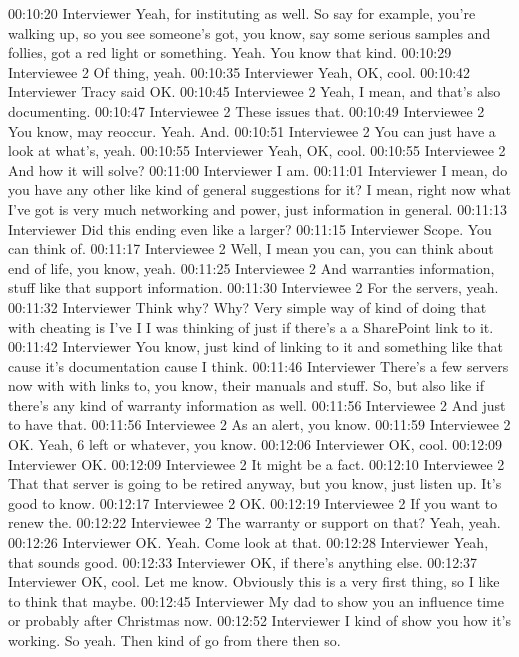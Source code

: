 00:10:20 Interviewer
Yeah, for instituting as well. So say for example, you're walking up, so you see someone's got, you know, say some serious samples and follies, got a red light or something. Yeah. You know that kind.
00:10:29 Interviewee 2 
Of thing, yeah.
00:10:35 Interviewer
Yeah, OK, cool.
00:10:42 Interviewer
Tracy said OK.
00:10:45 Interviewee 2 
Yeah, I mean, and that's also documenting.
00:10:47 Interviewee 2 
These issues that.
00:10:49 Interviewee 2 
You know, may reoccur. Yeah. And.
00:10:51 Interviewee 2 
You can just have a look at what's, yeah.
00:10:55 Interviewer
Yeah, OK, cool.
00:10:55 Interviewee 2 
And how it will solve?
00:11:00 Interviewer
I am.
00:11:01 Interviewer
I mean, do you have any other like kind of general suggestions for it? I mean, right now what I've got is very much networking and power, just information in general.
00:11:13 Interviewer
Did this ending even like a larger?
00:11:15 Interviewer
Scope. You can think of.
00:11:17 Interviewee 2 
Well, I mean you can, you can think about end of life, you know, yeah.
00:11:25 Interviewee 2 
And warranties information, stuff like that support information.
00:11:30 Interviewee 2 
For the servers, yeah.
00:11:32 Interviewer
Think why? Why? Very simple way of kind of doing that with cheating is I've I I was thinking of just if there's a a SharePoint link to it.
00:11:42 Interviewer
You know, just kind of linking to it and something like that cause it's documentation cause I think.
00:11:46 Interviewer
There's a few servers now with with links to, you know, their manuals and stuff. So, but also like if there's any kind of warranty information as well.
00:11:56 Interviewee 2 
And just to have that.
00:11:56 Interviewee 2 
As an alert, you know.
00:11:59 Interviewee 2 
OK. Yeah, 6 left or whatever, you know.
00:12:06 Interviewer
OK, cool.
00:12:09 Interviewer
OK.
00:12:09 Interviewee 2 
It might be a fact.
00:12:10 Interviewee 2 
That that server is going to be retired anyway, but you know, just listen up. It's good to know.
00:12:17 Interviewee 2 
OK.
00:12:19 Interviewee 2 
If you want to renew the.
00:12:22 Interviewee 2 
The warranty or support on that? Yeah, yeah.
00:12:26 Interviewer
OK. Yeah. Come look at that.
00:12:28 Interviewer
Yeah, that sounds good.
00:12:33 Interviewer
OK, if there's anything else.
00:12:37 Interviewer
OK, cool. Let me know. Obviously this is a very first thing, so I like to think that maybe.
00:12:45 Interviewer
My dad to show you an influence time or probably after Christmas now.
00:12:52 Interviewer
I kind of show you how it's working. So yeah. Then kind of go from there then so.
